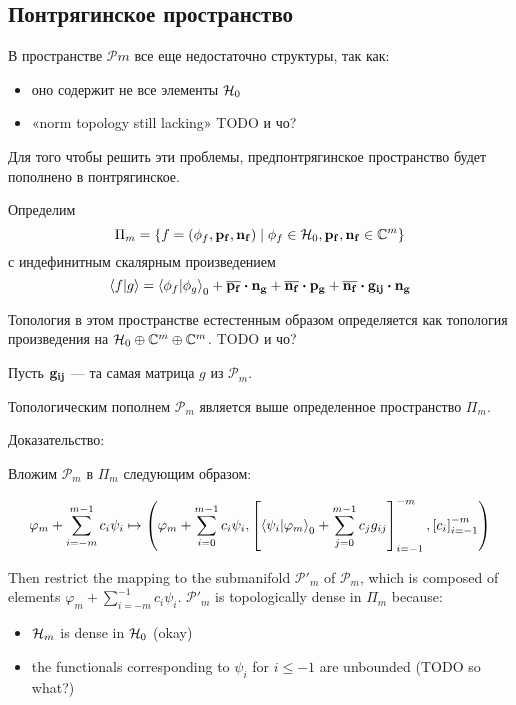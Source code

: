 \subsection{Понтрягинское пространство}
В пространстве $\mathcal{P}{m}$ все еще недостаточно структуры, так как:
\begin{itemize}
\item оно содержит не все элементы $\mathcal{H}_{0}$
\item «norm topology still lacking» TODO и чо?
\end{itemize}

Для того чтобы решить эти проблемы, предпонтрягинское пространство будет пополнено в понтрягинское.

Определим 
\[
\Pi_m = \{f = (\phi_f, \vb{p_f}, \vb{n_f}) \mid \phi_f \in \mathcal{H}_{0}, \vb{p_f}, \vb{n_f} \in \mathbb{C}^m \}
\]
с индефинитным скалярным произведением
\[
\ip{f}{g} =
\ip{\phi_f}{\phi_g}_0 +
\cconj{\vb{p_f}} \vdot \vb{n_g} +
\cconj{\vb{n_f}} \vdot \vb{p_g} + 
\cconj{\vb{n_f}} \vdot \vb{g_{ij}} \vdot \vb{n_g}
\]

Топология в этом пространстве естестенным образом определяется как топология произведения на $\mathcal{H}_{0} \oplus \mathbb{C}^m \oplus \mathbb{C}^m$. TODO и чо?

Пусть $\vb{g_{ij}}$ — та самая матрица $g$ из $\mathcal{P}_m$. 

\begin{theorem}
Топологическим пополнем $\mathcal{P}_m$ является выше определенное пространство $\Pi_m$.
\end{theorem}

Доказательство:

Вложим $\mathcal{P}_m$ в $\Pi_m$ следующим образом:

\[
\varphi_m + \sum\limits_{i = -m}^{m - 1} c_i \psi_i \mapsto
\left(
\varphi_m + \sum\limits_{i = 0}^{m - 1} c_i \psi_i,
\left[ \ip{\psi_i}{\varphi_m}_0 + \sum\limits_{j = 0}^{m - 1} c_j g_{ij} \right]_{i = -1}^{-m},
\left[ c_i \right]_{i = -1}^{-m}
\right)
\]

Then restrict the mapping to the submanifold $\mathcal{P}'_m$ of $\mathcal{P}_m$, which is composed of elements $\varphi_m + \sum\limits_{i = - m}^{-1} c_i \psi_i$. $\mathcal{P}'_m$ is topologically dense in $\Pi_m$ because:

\begin{itemize}
\item $\mathcal{H}_{m}$ is dense in $\mathcal{H}_{0}$ (okay)
\item the functionals corresponding to $\psi_i$ for $i \le -1$ are unbounded (TODO so what?)
\end{itemize}

